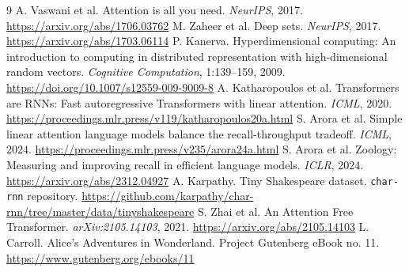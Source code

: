 \documentclass[11pt]{article}
\begin{document}
\begin{thebibliography}{9}
 A. Vaswani et al. Attention is all you need. \emph{NeurIPS}, 2017. \url{https://arxiv.org/abs/1706.03762}
 M. Zaheer et al. Deep sets. \emph{NeurIPS}, 2017. \url{https://arxiv.org/abs/1703.06114}
 P. Kanerva. Hyperdimensional computing: An introduction to computing in distributed representation with high-dimensional random vectors. \emph{Cognitive Computation}, 1:139--159, 2009. \url{https://doi.org/10.1007/s12559-009-9009-8}
 A. Katharopoulos et al. Transformers are RNNs: Fast autoregressive Transformers with linear attention. \emph{ICML}, 2020. \url{https://proceedings.mlr.press/v119/katharopoulos20a.html}
 S. Arora et al. Simple linear attention language models balance the recall-throughput tradeoff. \emph{ICML}, 2024. \url{https://proceedings.mlr.press/v235/arora24a.html}
 S. Arora et al. Zoology: Measuring and improving recall in efficient language models. \emph{ICLR}, 2024. \url{https://arxiv.org/abs/2312.04927}
 A. Karpathy. Tiny Shakespeare dataset. \texttt{char-rnn} repository. \url{https://github.com/karpathy/char-rnn/tree/master/data/tinyshakespeare}
 S. Zhai et al. An Attention Free Transformer. \emph{arXiv:2105.14103}, 2021. \url{https://arxiv.org/abs/2105.14103}
 L. Carroll. Alice's Adventures in Wonderland. Project Gutenberg eBook no. 11. \url{https://www.gutenberg.org/ebooks/11}
\end{thebibliography}
\end{document}
